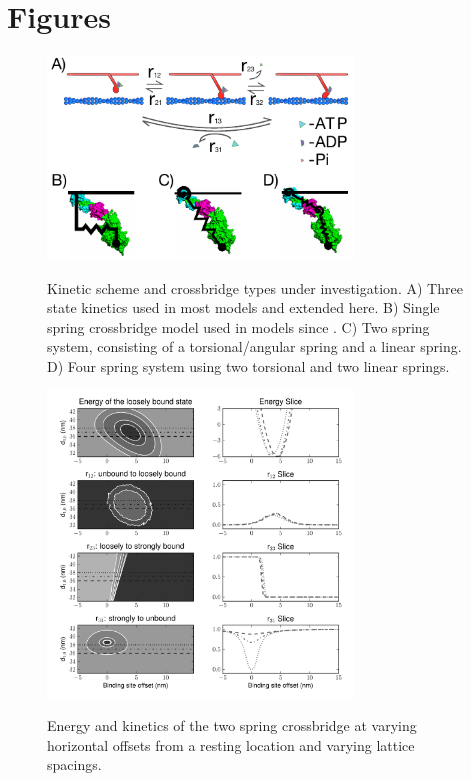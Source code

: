 \documentclass[]{article}
\begin{document}
\section*{Figures}

\begin{figure}[p]
    \begin{center}
    \includegraphics[width=3.2in]{../imgs/Figure1.pdf}
    \label{fig:types}
    \caption{
        Kinetic scheme and crossbridge types under investigation. 
        A) Three state kinetics used in most models and extended here. 
        B) Single spring crossbridge model used in models since \cite{Huxley1957e}. 
        C) Two spring system, consisting of a torsional/angular spring and a linear spring. 
        D) Four spring system using two torsional and two linear springs.}
    \end{center}
\end{figure}

\begin{figure}[p]
    \begin{center}
    \includegraphics[width=3.2in]{../imgs/Figure2.pdf}
    \label{fig:2s}
    \caption{
        Energy and kinetics of the two spring crossbridge at varying horizontal offsets from a resting location and varying lattice spacings.}
    \end{center}
\end{figure}
\end{document}
